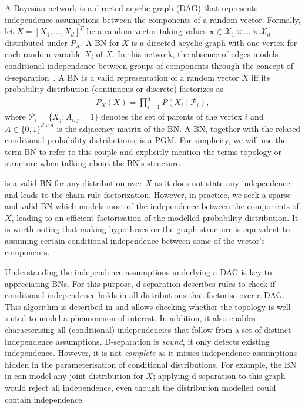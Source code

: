 A Bayesian network is a directed acyclic graph (DAG) that represents independence assumptions between the components of a random vector. Formally, let $X = \left[X_1, \hdots, X_d\right]^T$ be a random vector taking values $\bm{x} \in \mathcal{X}_1 \times \dots \times \mathcal{X}_d$ distributed under $P_{X}$. A BN for $X$ is a directed acyclic graph with one vertex for each random variable $X_i$ of $X$. In this network, the absence of edges models conditional independence between groups of components through the concept of d-separation~\citep{geiger_d-separation_1990}. A BN is a valid representation of a random vector $X$ iff its probability distribution (continuous or discrete) factorizes as
\begin{align}
    P_{X}(X) = \prod^d_{i=1}P(X_i\mid \mathcal{P}_i),\label{eq:BN-fact}
\end{align}
where  $\mathcal{P}_i = \{X_j: A_{i,j} = 1 \}$ denotes the set of parents of the vertex $i$ and $A \in \{0, 1\}^{d\times d}$ is the adjacency matrix of the BN. A BN, together with the related conditional probability distributions, is a PGM. For simplicity, we will use the term BN to refer to this couple and explicitly mention the terms topology or structure when talking about the BN's structure.

 is a valid BN for any distribution over $X$ as it does not state any independence and leads to the chain rule factorization. However, in practice, we seek a sparse and valid BN which models most of the independence between the components of $X$, leading to an efficient factorisation of the modelled probability distribution. It is worth noting that making hypotheses on the graph structure is equivalent to assuming certain conditional independence between some of the vector's components.

Understanding the independence assumptions underlying a DAG is key to appreciating BNs. For this purpose, d-separation describes rules to check if conditional independence holds in all distributions that factorise over a DAG. This algorithm is described in  and allows checking whether the topology is well suited to model a phenomenon of interest. In addition, it also enables characterising all (conditional) independencies that follow from a set of distinct independence assumptions. D-separation is \textit{sound}, it only detects existing independence. However, it is not \textit{complete} as it misses independence assumptions hidden in the parameterisation of conditional distributions. For example, the BN in  can model any joint distribution for $X$; applying d-separation to this graph would reject all independence, even though the distribution modelled could contain independence.


